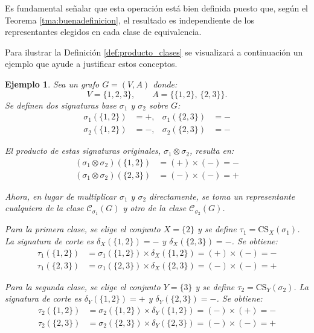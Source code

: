 \documentclass[11pt,a4paper,spanish]{report}
\theoremstyle{plain}
\newtheorem{ejemplo}{Ejemplo}[chapter]
\begin{document}
Es fundamental señalar que esta operación está bien definida puesto que, según el Teorema \ref{tma:buenadefinicion}, el resultado es independiente de los representantes elegidos en cada clase de equivalencia.

Para ilustrar la Definición \ref{def:producto_clases} se visualizará a continuación un ejemplo que ayude a justificar estos conceptos.

\begin{ejemplo}
Sea un grafo $G=(V,A)$ donde:
\[
V=\{1,2,3\}, \qquad A=\{\{1,2\},\,\{2,3\}\}.
\]
Se definen dos signaturas base $\sigma_1$ y $\sigma_2$ sobre $G$:
\begin{align*}
\sigma_1(\{1,2\})&=+, & \sigma_1(\{2,3\})&=- \\
\sigma_2(\{1,2\})&=-, & \sigma_2(\{2,3\})&=-
\end{align*}

El producto de estas signaturas originales, $\sigma_1 \otimes \sigma_2$, resulta en:
\begin{align*}
(\sigma_1 \otimes \sigma_2)(\{1,2\}) &= (+)\times(-) = - \\
(\sigma_1 \otimes \sigma_2)(\{2,3\}) &= (-)\times(-) = +
\end{align*}

Ahora, en lugar de multiplicar $\sigma_1$ y $\sigma_2$ directamente, se toma un representante cualquiera de la clase $\mathcal{C}_{\sigma_1}(G)$ y otro de la clase $\mathcal{C}_{\sigma_2}(G)$.

Para la primera clase, se elige el conjunto $X=\{2\}$ y se define $\tau_1 = \mathrm{CS}_X(\sigma_1)$. La signatura de corte es $\delta_X(\{1,2\})=-$ y $\delta_X(\{2,3\})=-$. Se obtiene:
\begin{align*}
\tau_1(\{1,2\}) &= \sigma_1(\{1,2\}) \times \delta_X(\{1,2\}) = (+)\times(-) = - \\
\tau_1(\{2,3\}) &= \sigma_1(\{2,3\}) \times \delta_X(\{2,3\}) = (-)\times(-) = +
\end{align*}

Para la segunda clase, se elige el conjunto $Y=\{3\}$ y se define $\tau_2 = \mathrm{CS}_Y(\sigma_2)$. La signatura de corte es $\delta_Y(\{1,2\})=+$ y $\delta_Y(\{2,3\})=-$. Se obtiene:
\begin{align*}
\tau_2(\{1,2\}) &= \sigma_2(\{1,2\}) \times \delta_Y(\{1,2\}) = (-)\times(+) = - \\
\tau_2(\{2,3\}) &= \sigma_2(\{2,3\}) \times \delta_Y(\{2,3\}) = (-)\times(-) = +
\end{align*}


\end{ejemplo}
\end{document}
